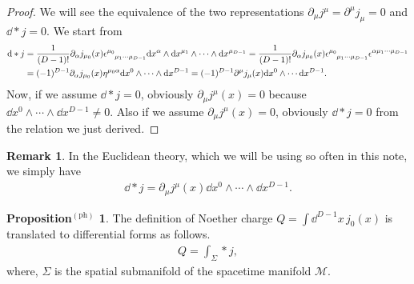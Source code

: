 \documentclass{article}
\theoremstyle{definition}
\newtheorem{propositionph}{Proposition$^\mathrm{(ph)}$}[section]
\newtheorem{remark}{Remark}[section]
\numberwithin{equation}{section}
\newcommand{\del}{\partial_\mu}
\begin{document}
\begin{proof}
  We will see the equivalence of the two representations $\del j^\mu = \partial^\mu j_\mu = 0$ and $\dd * j = 0$. We start from
  \begin{align}
    \dd * j
    &= \frac{1}{(D - 1)!}\partial_\alpha j_{\mu_0}(x)
      \tensor{\epsilon}{^{\mu_0}_{\mu_1\cdots\mu_{D-1}}} \dd x^{\alpha} \wedge \dd x^{\mu_1} \wedge \cdots \wedge \dd x^{\mu_{D-1}} = \frac{1}{(D - 1)!}\partial_\alpha j_{\mu_0}(x)
      \tensor{\epsilon}{^{\mu_0}_{\mu_1\cdots\mu_{D-1}}}\tensor{\epsilon}{^{\alpha\mu_1\cdots\mu_{D-1}}} \notag\\
    &= (-1)^{D-1}\partial_\alpha j_{\mu_0}(x)\eta^{{\mu_0}\alpha} \dd x^{0} \wedge \cdots \wedge \dd x^{D-1} = (-1)^{D-1}\partial^\mu j_\mu(x) \dd x^0 \wedge \cdots \dd x^{D-1}.
  \end{align}
  Now, if we assume $\dd * j = 0$, obviously $\partial_\mu j^\mu(x) = 0$ because $\dd x^0 \wedge \cdots \wedge \dd x^{D-1} \ne 0$. Also if we assume $\partial_\mu j^\mu(x) = 0$, obviously $\dd * j = 0$ from the relation we just derived.
\end{proof}

\begin{remark}
  In the Euclidean theory, which we will be using so often in this note, we simply have
  \begin{align}
    \dd * j = \del j^\mu(x) \dd x^0 \wedge \cdots \wedge \dd x^{D-1}.
  \end{align}
\end{remark}

\begin{propositionph}
  The definition of Noether charge ${\displaystyle Q = \int \dd^{D-1}x \, j_0(x)}$ is translated to differential forms as follows.
  \begin{align}
    Q = \int_\Sigma * j, \label{noether-charge}
  \end{align}
  where, $\Sigma$ is the spatial submanifold of the spacetime manifold $\mathscr{M}$.
\end{propositionph}
\end{document}
